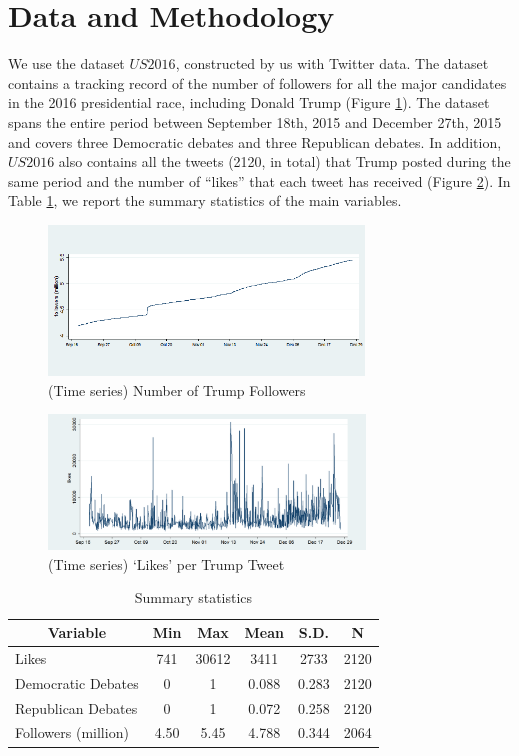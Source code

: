\documentclass[letterpaper]{article}
\begin{document}
\section{Data and Methodology}
We use the dataset $\textit{US2016}$, constructed by us with Twitter data. The dataset contains a tracking record of the number of followers for all the major candidates in the 2016 presidential race, including Donald Trump (Figure \ref{followers}). The dataset spans the entire period between September 18th, 2015 and December 27th, 2015 and covers three Democratic debates and three Republican debates. In addition, $\textit{US2016}$ also contains all the tweets (2120, in total) that Trump posted during the same period and the number of ``likes'' that each tweet has received (Figure \ref{tweetLikes}). In Table \ref{sumstat}, we report the summary statistics of the main variables.

\begin{figure}[H]
\caption{(Time series) Number of Trump Followers}
\label{followers}
\includegraphics[height=4cm]{followers_revised.png}
\end{figure}

\begin{figure}[H]
\caption{(Time series) `Likes' per Trump Tweet}
\label{tweetLikes}
\includegraphics[height=3.6cm]{likes_time_revised.png}
\end{figure}


\begin{table}[htbp]\centering \caption{Summary statistics \label{sumstat}}
\setlength{\tabcolsep}{3pt}
\begin{tabular}{l c c c c  c}\hline\hline
\multicolumn{1}{c}{\textbf{Variable}} &\textbf{Min}& \textbf{Max}& \textbf{Mean}
&\textbf{S.D.} & \textbf{N}\\ \hline
Likes & 741& 30612&  3411 & 2733  & 2120\\
Democratic Debates & 0 & 1& 0.088 & 0.283  & 2120\\
Republican Debates &0 & 1& 0.072 & 0.258  & 2120\\
Followers (million) &4.50& 5.45& 4.788 & 0.344  & 2064\\
\hline
\end{tabular}
\end{table}
\end{document}

